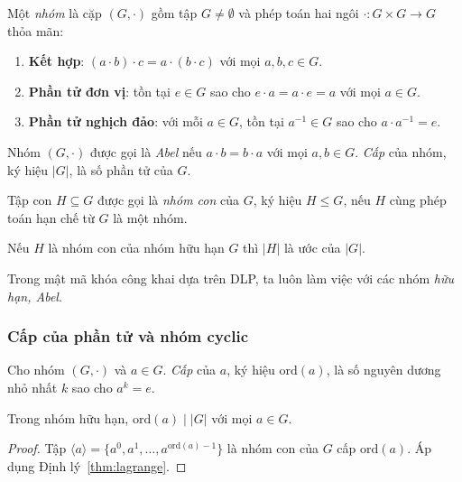\documentclass[../DoAn.tex]{subfiles}
\begin{document}
\begin{definition}[Nhóm]
Một \emph{nhóm} là cặp $(G, \cdot)$ gồm tập $G \neq \emptyset$ và phép toán hai ngôi $\cdot : G \times G \to G$ thỏa mãn:
\begin{enumerate}
	\item \textbf{Kết hợp}: $(a \cdot b) \cdot c = a \cdot (b \cdot c)$ với mọi $a, b, c \in G$.
	\item \textbf{Phần tử đơn vị}: tồn tại $e \in G$ sao cho $e \cdot a = a \cdot e = a$ với mọi $a \in G$.
	\item \textbf{Phần tử nghịch đảo}: với mỗi $a \in G$, tồn tại $a^{-1} \in G$ sao cho $a \cdot a^{-1} = e$.
\end{enumerate}
Nhóm $(G, \cdot)$ được gọi là \emph{Abel} nếu $a \cdot b = b \cdot a$ với mọi $a, b \in G$. \emph{Cấp} của nhóm, ký hiệu $|G|$, là số phần tử của $G$.
\end{definition}

\begin{definition}
Tập con $H \subseteq G$ được gọi là \emph{nhóm con} của $G$, ký hiệu $H \leq G$, nếu $H$ cùng phép toán hạn chế từ $G$ là một nhóm.
\end{definition}

\begin{theorem}[Lagrange]
\label{thm:lagrange}
Nếu $H$ là nhóm con của nhóm hữu hạn $G$ thì $|H|$ là ước của $|G|$.
\end{theorem}

Trong mật mã khóa công khai dựa trên DLP, ta luôn làm việc với các nhóm \emph{hữu hạn, Abel}.

\subsubsection{Cấp của phần tử và nhóm cyclic}

\begin{definition}
Cho nhóm $(G, \cdot)$ và $a \in G$. \emph{Cấp} của $a$, ký hiệu $\mathrm{ord}(a)$, là số nguyên dương nhỏ nhất $k$ sao cho $a^k = e$.
\end{definition}

\begin{corollary}
Trong nhóm hữu hạn, $\mathrm{ord}(a) \mid |G|$ với mọi $a \in G$.
\end{corollary}

\begin{proof}
Tập $\langle a \rangle = \{a^0, a^1, \ldots, a^{\mathrm{ord}(a)-1}\}$ là nhóm con của $G$ cấp $\mathrm{ord}(a)$. Áp dụng Định lý~\ref{thm:lagrange}.
\end{proof}
\end{document}
